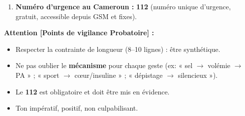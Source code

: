 \documentclass[11pt]{article}
\begin{document}
\begin{corrige}
\begin{enumerate}
\begin{itemize}
    \end{itemize}
    \item \textbf{Numéro d'urgence au Cameroun :} \textbf{112} (numéro unique d'urgence, gratuit, accessible depuis GSM et fixes).
\end{enumerate}
\par\textbf{Attention [Points de vigilance Probatoire] :}
\begin{itemize}
    \item Respecter la contrainte de longueur (8--10 lignes) : être synthétique.
    \item Ne pas oublier le \textbf{mécanisme} pour chaque geste (ex: « sel $\to$ volémie $\to$ PA » ; « sport $\to$ cœur/insuline » ; « dépistage $\to$ silencieux »).
    \item Le \textbf{112} est obligatoire et doit être mis en évidence.
    \item Ton impératif, positif, non culpabilisant.
\end{itemize}
\end{corrige}
\end{document}
